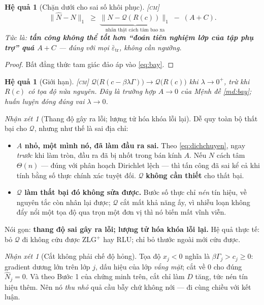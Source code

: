 \documentclass[11pt,a4paper]{article}
\newtheorem{hequa}[dinhly]{Hệ quả}
\theoremstyle{remark}
\newtheorem{nhanxet}[dinhly]{Nhận xét}
\newcommand{\quant}{\mathcal{Q}}
\newcommand{\epstr}{\bar\varepsilon_{\mathrm{tr}}}
\begin{document}
\begin{hequa}[Chặn dưới cho sai số khôi phục]
\label{hq:chanduoi}
\textsc{[cm]}\;
\[
\|\hat N-N\|_1\;\ge\;
\underbrace{\bigl\|N-\quant(R(c))\bigr\|_1}_{\text{nhãn thật cách tâm bao xa}}
\;-\;(A+C).
\]
Tức là: \textbf{tấn công không thể tốt hơn ``đoán tiên nghiệm lớp của tập phụ
trợ'' quá $A+C$} --- đúng với \emph{mọi} $\epstr$, không cần ngưỡng.
\end{hequa}

\begin{proof}
Bất đẳng thức tam giác đảo áp vào \eqref{eq:bay}.
\end{proof}

\begin{hequa}[Giới hạn]
\label{hq:gioihan}
\textsc{[cm]}\; $\quant\bigl(R(c-\beta\lambda\Gamma)\bigr)\to\quant\bigl(R(c)\bigr)$
khi $\lambda\to0^+$, trừ khi $R(c)$ có tọa độ nửa nguyên. Đây là trường hợp
$A\to0$ của Mệnh đề \ref{md:bay}; huấn luyện đóng đúng vai $\lambda\to0$.
\end{hequa}

\begin{nhanxet}[Thang độ gây ra lỗi; lượng tử hóa khóa lỗi lại]
\label{nx:luongtu}
Dễ quy toàn bộ thất bại cho $\quant$, nhưng như thế là sai địa chỉ:
\begin{itemize}
\item \textbf{$A$ nhỏ, một mình nó, đã làm đầu ra sai.} Theo
  \eqref{eq:dichchuyen}, ngay \emph{trước} khi làm tròn, đầu ra đã bị nhốt
  trong bán kính $A$. Nếu $N$ cách tâm $\Theta(n)$ --- đúng với phân hoạch
  Dirichlet lệch --- thì tấn công đã sai kể cả khi tính bằng số thực chính
  xác tuyệt đối. $\quant$ \textbf{không cần thiết} cho thất bại.
\item \textbf{$\quant$ làm thất bại đó không sửa được.} Bước số thực chỉ
  \emph{nén} tín hiệu, về nguyên tắc còn nhân lại được; $\quant$ cắt mất khả
  năng ấy, vì nhiễu loạn không đẩy nổi một tọa độ qua trọn một đơn vị thì nó
  biến mất vĩnh viễn.
\end{itemize}
Nói gọn: \textbf{thang độ sai gây ra lỗi; lượng tử hóa khóa lỗi lại.} Hệ quả
thực tế: bỏ $\quant$ đi không cứu được ZLG$^+$ hay RLU; chỉ bỏ thước ngoài
mới cứu được.
\end{nhanxet}

\begin{nhanxet}[Cắt không phải chế độ hỏng]
\label{nx:cat}
Tọa độ $x_j<0$ nghĩa là $\beta\Gamma_j>c_j\ge0$: gradient dương lớn trên lớp
$j$, dấu hiệu của lớp \emph{vắng mặt}; cắt về $0$ cho đúng $\hat N_j=0$. Và
theo Bước 1 của chứng minh trên, cắt chỉ làm $D$ tăng, tức nén tín hiệu thêm.
Nên nó \emph{thu nhỏ} quả cầu bẫy chứ không nới --- đi cùng chiều với kết
luận.
\end{nhanxet}
\end{document}
